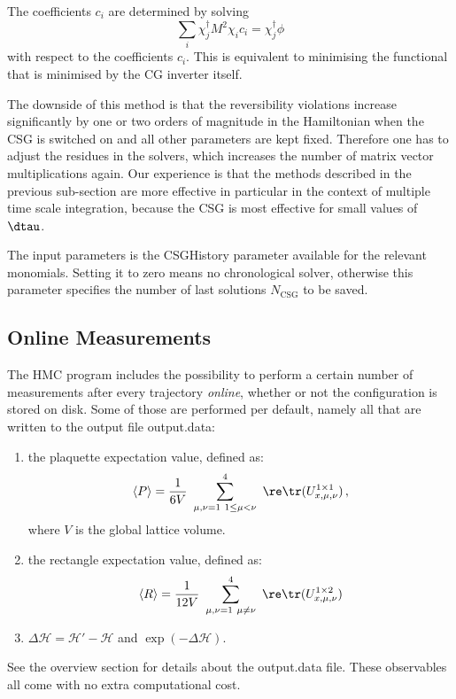 The coefficients $c_i$ are determined by solving
\begin{equation}
  \label{eq:chrono}
  \sum_i \chi_j^\dagger M^2 \chi_i c_i = \chi_j^\dagger \phi
\end{equation}
with respect to the coefficients $c_i$. This is equivalent to
minimising the functional that is minimised by the CG inverter
itself.

The downside of this method is that the reversibility violations
increase significantly by one or two orders of magnitude in the
Hamiltonian when the CSG is switched on and all other parameters are
kept fixed. Therefore one has to adjust the residues in the solvers,
which increases the number of matrix vector multiplications again.
Our experience is that the methods described in the previous
sub-section are more effective in particular in the context of
multiple time scale integration, because the CSG is most effective for
small values of $\dtau$.

The input parameters is the {\ttfamily CSGHistory} parameter
available for the relevant monomials. Setting it to zero means no
chronological solver, otherwise this parameter specifies the number of
last solutions $N_\mathrm{CSG}$ to be saved.

\subsection{Online Measurements}
\label{sec:online}

The HMC program includes the possibility to perform a certain number
of measurements after every trajectory \emph{online}, whether or not
the configuration is stored on disk. Some of those are performed per
default, namely all that are written to the output file {\ttfamily
  output.data}: 
\begin{enumerate}
\item the plaquette expectation value, defined as:
  \[
  \langle P\rangle = \frac{1}{6 V}\ \sum_{\substack{
        \mu,\nu=1\ 1\leq\mu<\nu}}^4\ \re\tr(U^{1\times1}_{x,\mu,\nu})\, ,
  \]
  where $V$ is the global lattice volume.
\item the rectangle expectation value, defined as:
  \[
  \langle R\rangle = \frac{1}{12V}\ \sum_{\substack{\mu,\nu=1\
      \mu\neq\nu}}^4\ 
    \re\tr(U^{1\times2}_{x,\mu,\nu})
  \]
\item $\Delta\mathcal{H} = \mathcal{H}'-\mathcal{H}$ and $\exp(-\Delta\mathcal{H})$.
\end{enumerate}
See the overview section for details about the {\ttfamily output.data}
file. These observables all come with no extra computational cost.

